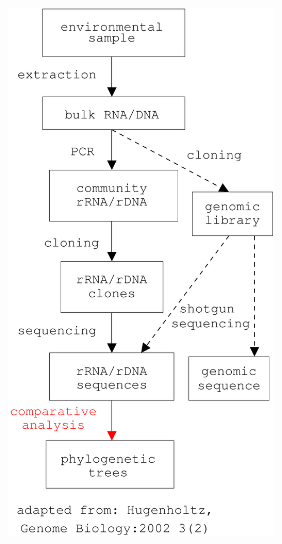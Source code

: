 \documentclass[landscape]{slides}
\begin{document}
\begin{slide}
\begin{minipage}{7in}
\vspace{1.3in}
\end{minipage}
\hspace{0.1in}
\begin{minipage}{3in}
\includegraphics[height=5.5in]{figs/environmental}
\vspace{1in}
\end{minipage}
\end{slide}
\end{document}
